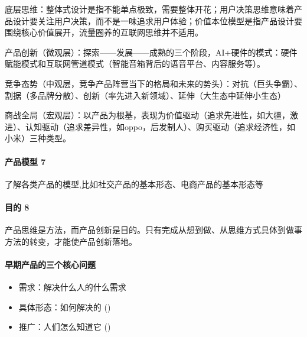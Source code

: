 \documentclass[letterpaper,11pt,english]{sphinxmanual}
\begin{document}
底层思维：整体式设计是指不能单点极致，需要整体开花；用户决策思维意味着产品设计要关注用户决策，而不是一味追求用户体验；价值本位模型是指产品设计要围绕核心价值展开，流量圈养的互联网思维并不适用。

产品创新（微观层）：探索——发展——成熟的三个阶段，AI+硬件的模式：硬件赋能模式和互联网管道模式（智能音箱背后的语音平台、内容服务等）。

竞争态势（中观层，竞争产品阵营当下的格局和未来的势头）：对抗（巨头争霸）、割据（多品牌分散）、创新（率先进入新领域）、延伸（大生态中延伸小生态）

商战全局（宏观层）：以产品为根基，表现为价值驱动（追求先进性，如大疆，激进）、认知驱动（追求差异性，如oppo，后发制人）、购买驱动（追求经济性，如小米）三种类型。


\paragraph{产品模型 7\sphinxfootnotemark[28]}
\label{\detokenize{chapter_introduction/Product:id44}}%
\begin{footnotetext}[28]\sphinxAtStartFootnote
{}
%
\end{footnotetext}\ignorespaces 
了解各类产品的模型,比如社交产品的基本形态、电商产品的基本形态等


\paragraph{目的 8\sphinxfootnotemark[29]}
\label{\detokenize{chapter_introduction/Product:id45}}%
\begin{footnotetext}[29]\sphinxAtStartFootnote
{}
%
\end{footnotetext}\ignorespaces 
产品思维是方法，而产品创新是目的。只有完成从想到做、从思维方式具体到做事方法的转变，才能使产品创新落地。


\paragraph{早期产品的三个核心问题}
\label{\detokenize{chapter_introduction/Product:id46}}\begin{itemize}
\item {} 
需求：解决什么人的什么需求 

\item {} 
具体形态：如何解决的 {\hyperref[\detokenize{chapter_knowledge/index:chap-skill}]{}} ()

\item {} 
推广：人们怎么知道它 {\hyperref[\detokenize{chapter_idea/GTM:yunying}]{}} ()

\end{itemize}
\end{document}
